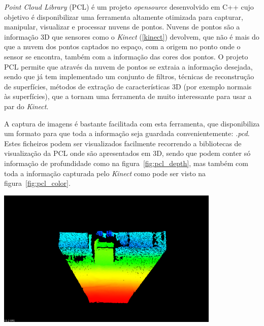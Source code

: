 \emph{Point Cloud Library} (PCL) é um projeto \emph{opensource} desenvolvido em C++ cujo objetivo é disponibilizar uma ferramenta altamente otimizada para capturar, manipular, visualizar e processar nuvens de pontos. Nuvens de pontos são a informação 3D que sensores como o \emph{Kinect} (\ref{kinect}) devolvem, que não é mais do que a nuvem dos pontos captados no espaço, com a origem no ponto onde o sensor se encontra, também com a informação das cores dos pontos.
O projeto PCL \cite{Rusu_ICRA2011_PCL} permite que através da nuvem de pontos se extraia a informação desejada, sendo que já tem implementado um conjunto de filtros, técnicas de reconstrução de superfícies, métodos de extração de características 3D (por exemplo normais às superfícies), que a tornam uma ferramenta de muito interessante para usar a par do \emph{Kinect}.

A captura de imagens é bastante facilitada com esta ferramenta, que disponibiliza um formato para que toda a informação seja guardada convenientemente: \emph{.pcd}. Estes ficheiros podem ser visualizados facilmente recorrendo a bibliotecas de visualização da PCL onde são apresentados em 3D, sendo que podem conter só informação de profundidade como na figura~\ref{fig:pcl_depth}, mas também com toda a informação capturada pelo \emph{Kinect} como pode ser visto na figura~\ref{fig:pcl_color}.

\begin{center}
	\includegraphics[width=0.80\textwidth]{figures/pcl_openni.png}
	\label{fig:pcl_depth}
	
\end{center}

